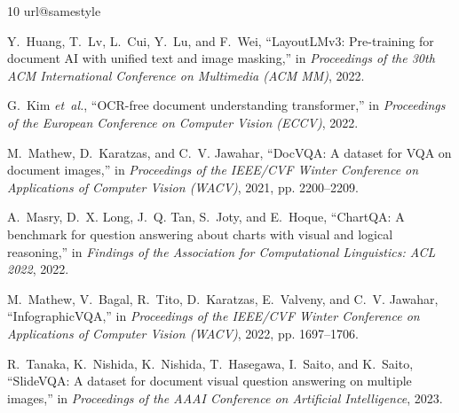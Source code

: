 \documentclass[pdflatex,sn-basic]{sn-jnl}%
\theoremstyle{thmstyletwo}%
\begin{document}
\begin{thebibliography}{10}
\providecommand{\url}[1]{#1}
\csname url@samestyle\endcsname
\providecommand{\newblock}{\relax}
\providecommand{\bibinfo}[2]{#2}
\providecommand{\BIBentrySTDinterwordspacing}{\spaceskip=0pt\relax}
\providecommand{\BIBentryALTinterwordstretchfactor}{4}
\providecommand{\BIBentryALTinterwordspacing}{\spaceskip=\fontdimen2\font plus
\BIBentryALTinterwordstretchfactor\fontdimen3\font minus
  \fontdimen4\font\relax}
\providecommand{\BIBforeignlanguage}[2]{{%
\expandafter\ifx\csname l@#1\endcsname\relax
\typeout{** WARNING: IEEEtran.bst: No hyphenation pattern has been}%
\typeout{** loaded for the language `#1'. Using the pattern for}%
\typeout{** the default language instead.}%
\else
\language=\csname l@#1\endcsname
\fi
#2}}
\providecommand{\BIBdecl}{\relax}
\BIBdecl

Y.~Huang, T.~Lv, L.~Cui, Y.~Lu, and F.~Wei, ``{LayoutLMv3}: Pre-training for
  document {AI} with unified text and image masking,'' in \emph{Proceedings of
  the 30th ACM International Conference on Multimedia (ACM MM)}, 2022.

G.~Kim \emph{et~al.}, ``{OCR}-free document understanding transformer,'' in
  \emph{Proceedings of the European Conference on Computer Vision (ECCV)},
  2022.

M.~Mathew, D.~Karatzas, and C.~V. Jawahar, ``{DocVQA}: A dataset for {VQA} on
  document images,'' in \emph{Proceedings of the IEEE/CVF Winter Conference on
  Applications of Computer Vision (WACV)}, 2021, pp. 2200--2209.

A.~Masry, D.~X. Long, J.~Q. Tan, S.~Joty, and E.~Hoque, ``{ChartQA}: A
  benchmark for question answering about charts with visual and logical
  reasoning,'' in \emph{Findings of the Association for Computational
  Linguistics: ACL 2022}, 2022.

M.~Mathew, V.~Bagal, R.~Tito, D.~Karatzas, E.~Valveny, and C.~V. Jawahar,
  ``{InfographicVQA},'' in \emph{Proceedings of the IEEE/CVF Winter Conference
  on Applications of Computer Vision (WACV)}, 2022, pp. 1697--1706.

R.~Tanaka, K.~Nishida, K.~Nishida, T.~Hasegawa, I.~Saito, and K.~Saito,
  ``{SlideVQA}: A dataset for document visual question answering on multiple
  images,'' in \emph{Proceedings of the AAAI Conference on Artificial
  Intelligence}, 2023.


\end{thebibliography}
\end{document}
